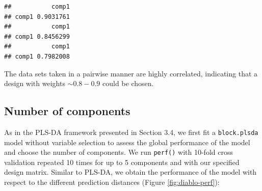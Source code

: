 \documentclass[]{book}
\newenvironment{Shaded}{\begin{snugshade}}{\end{snugshade}}
\newcommand{\KeywordTok}[1]{\textcolor[rgb]{0.13,0.29,0.53}{\textbf{#1}}}
\newcommand{\DataTypeTok}[1]{\textcolor[rgb]{0.13,0.29,0.53}{#1}}
\newcommand{\DecValTok}[1]{\textcolor[rgb]{0.00,0.00,0.81}{#1}}
\newcommand{\StringTok}[1]{\textcolor[rgb]{0.31,0.60,0.02}{#1}}
\newcommand{\OperatorTok}[1]{\textcolor[rgb]{0.81,0.36,0.00}{\textbf{#1}}}
\newcommand{\NormalTok}[1]{#1}
\begin{document}
\begin{Shaded}
\end{Shaded}

\begin{verbatim}
##           comp1
## comp1 0.9031761
##           comp1
## comp1 0.8456299
##           comp1
## comp1 0.7982008
\end{verbatim}

The data sets taken in a pairwise manner are highly correlated,
indicating that a design with weights \(\sim 0.8 - 0.9\) could be
chosen.

\subsection{Number of components}\label{number-of-components}

As in the PLS-DA framework presented in Section 3.4, we first fit a
\texttt{block.plsda} model without variable selection to assess the
global performance of the model and choose the number of components. We
run \texttt{perf()} with 10-fold cross validation repeated 10 times for
up to 5 components and with our specified design matrix. Similar to
PLS-DA, we obtain the performance of the model with respect to the
different prediction distances (Figure \ref{fig:diablo-perf}):
\end{document}
